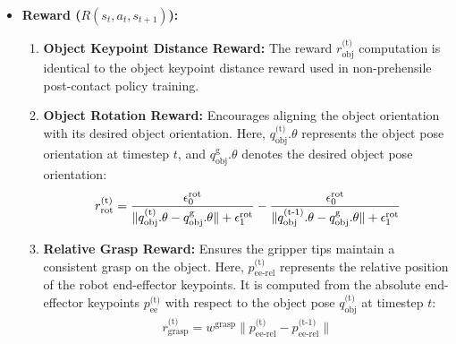 \begin{itemize}
    \medskip
    
    \item \textbf{Reward (\( R(s_t, a_t, s_{t+1}) \)):}
    \begin{enumerate}
        \item \textbf{Object Keypoint Distance Reward:} %
        The reward $r^\text{(t)}_\text{obj}$ computation is identical to the object keypoint distance reward used in non-prehensile post-contact policy training.
    
        \item \textbf{Object Rotation Reward:} Encourages aligning the object orientation with its desired object orientation. Here, $q^\text{(t)}_\text{obj}.\theta$ represents the object pose orientation at timestep $t$, and $q^\text{g}_\text{obj}.\theta$ denotes the desired object pose orientation:
        \[
        \begin{aligned}
        r^\text{(t)}_{\text{rot}} = {\epsilon_0^{\text{rot}}\over{\|q^\text{(t)}_\text{obj}.\theta - q^\text{g}_\text{obj}.\theta\| + \epsilon^{\text{rot}}_1}}
        - {\epsilon_0^{\text{rot}}\over{\|q^\text{(t-1)}_\text{obj}.\theta - q^\text{g}_\text{obj}.\theta\| + \epsilon^{\text{rot}}_1}}
        \end{aligned}
        \]
    
        \item \textbf{Relative Grasp Reward:} Ensures the gripper tips maintain a consistent grasp on the object. Here, \( p^\text{(t)}_\text{ee-rel} \) represents the relative position of the robot end-effector keypoints. It is computed from the absolute end-effector keypoints \( p^\text{(t)}_\text{ee} \) with respect to the object pose \( q^\text{(t)}_{\text{obj}} \) at timestep \( t \):
        \[
        \begin{aligned}
        r^\text{(t)}_{\text{grasp}} = w^{\text{grasp}}\|p^\text{(t)}_\text{ee-rel}- p^\text{(t-1)}_\text{ee-rel}\| 
        \end{aligned}
        \]
    

\end{enumerate}
\end{itemize}
